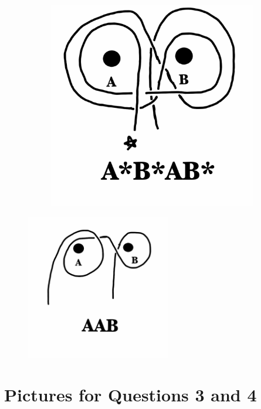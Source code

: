 \documentclass[12pt,letterpaper]{article}
\theoremstyle{definition}
\begin{document}
\begin{figure}[h!]
\begin{subfigure}[b]{0.4\textwidth}
        \includegraphics[width=\textwidth]{meeting02pics/AsBsABs-label.png}
    \end{subfigure}
\end{figure}

\begin{figure}[h]
    \includegraphics[height=2.5in]{meeting02pics/AABs-badlabel.png}
\end{figure}

\clearpage


\section*{Pictures for Questions 3 and 4}
\end{document}
